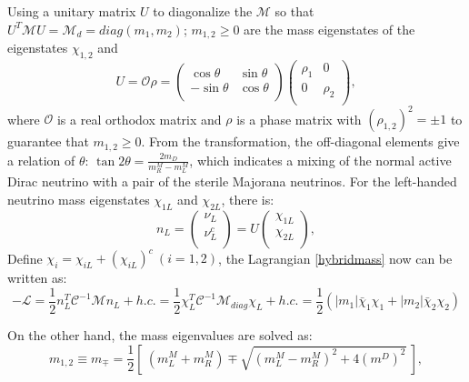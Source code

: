 Using a unitary matrix $U$ to diagonalize the $\mathcal M$ so that ${U}^T\mathcal{M} U =\mathcal {M}_d = diag(m_1, m_2)$; $m_{1,2}\geq 0$ are the mass eigenstates of the eigenstates $\chi_{1,2}$ and 
\begin{equation}\label{eq:massTransform}
U=\mathcal{O}\rho=\begin{pmatrix}
\cos\theta & \sin\theta\\
-\sin\theta & \cos\theta\\
\end{pmatrix}\begin{pmatrix}
\rho_1 & 0\\
0 & \rho_2\\
\end{pmatrix},
\end{equation}
where $\mathcal O$ is a real orthodox matrix and $\rho$ is a phase matrix with $(\rho_{1,2})^2=\pm1$ to guarantee that $m_{1,2}\geq 0$.
From the transformation, the off-diagonal elements give a relation of $\theta$: $\tan 2\theta = \frac{2m_D}{m^M_R-m^M_L}$, which indicates a mixing of the normal active Dirac neutrino with a pair of the sterile Majorana neutrinos. For the left-handed neutrino mass eigenstates $\chi_{1L}$ and $\chi_{2L}$, there is\cite{akhmedov2014majorana}:
\begin{equation}\label{eq:majorana_fields}
n_L=\begin{pmatrix}
\nu_{L}\\
\nu^c_{L}\\
\end{pmatrix}=U
\begin{pmatrix}
\chi_{1L}\\
\chi_{2L}\\
\end{pmatrix},
\end{equation}
Define
$\chi_{i}=\chi_{iL}+(\chi_{iL})^c~(i = 1,2)$, the Lagrangian \ref{hybridmass} now can be written as\cite{akhmedov2014majorana,giunti2007fundamentals}:
\begin{equation}
-\mathcal L=\frac{1}{2}n_L^T\mathcal{C}^{-1}\mathcal M n_L+h.c.=\frac{1}{2}\chi_L^T\mathcal{C}^{-1}\mathcal M_{diag} \chi_L+h.c.=\frac{1}{2}(|m_1|\bar\chi_1\chi_1+|m_2|\bar\chi_2\chi_2)
\end{equation}

On the other hand, the mass eigenvalues are solved as:
\begin{equation}
m_{1,2}\equiv m_{\mp} = \frac{1}{2}[~(m_L^M+m_R^M)\mp\sqrt{(m_L^M-m_R^M)^2+4(m^D)^2}~]\label{eq:majorana_massEigen},
\end{equation}

